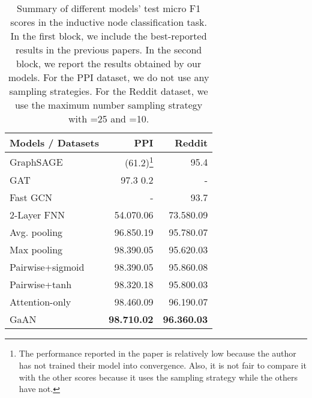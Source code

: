 \documentclass{article}
\begin{document}
	\begin{table}[!tb]
		\centering
		\caption{Summary of different models' test micro F1 scores in the inductive node classification task. In the first block, we include the best-reported results in the previous papers. In the second block, we report the results obtained by our models. For the PPI dataset, we do not use any sampling strategies. For the Reddit dataset, we use the maximum number sampling strategy with =25 and =10.}
\begin{tabular}{l r r}
			\hline 
			Models / Datasets & PPI &  Reddit\\
			\hline \hline
			GraphSAGE~{\tiny \citep{hamilton2017inductive}}  & (61.2)\footnote{The performance reported in the paper is relatively low because the author has not trained their model into convergence. Also, it is not fair to compare it with the other scores because it uses the sampling strategy while the others have not.} & 95.4 \\ 
			GAT~{\tiny \citep{velivckovic2017graph}}  & 97.3  0.2 & - \\ 
			Fast GCN~{\tiny \citep{chen2018fastgcn}} & - &93.7  \\  \hline
			2-Layer FNN   & 54.070.06 &73.580.09 \\ 
			Avg. pooling  &96.850.19 &95.780.07 \\ 
			Max pooling   &98.390.05 &95.620.03 \\
			Pairwise+sigmoid & 98.390.05 &  95.860.08 \\
			Pairwise+tanh    & 98.320.18 & 95.800.03 \\ 
			Attention-only   & 98.460.09 &96.190.07 \\ 
			GaAN  & \textbf{98.710.02} & \textbf{96.360.03}  \\ \hline 
		\end{tabular}
\label{table:result_node_classifation}
	\end{table}
	
\end{document}
